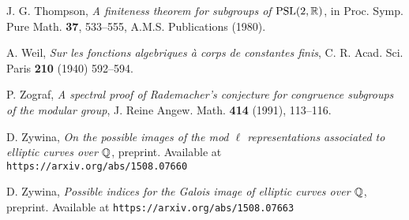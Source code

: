 \begin{thebibliography}{99}
 J. G. Thompson, \emph{A finiteness theorem for subgroups of $\operatorname{PSL}(2,\mathbb{R})$}, in Proc. Symp. Pure Math. \textbf{37}, 533--555, A.M.S. Publications (1980).

 A. Weil, \emph{Sur les fonctions algebriques \`{a} corps de constantes finis}, C. R. Acad. Sci. Paris \textbf{210} (1940) 592--594.

 P. Zograf, \emph{A spectral proof of Rademacher’s conjecture for congruence subgroups of the modular group}, J. Reine Angew. Math. \textbf{414} (1991), 113--116.

 D. Zywina, \emph{On the possible images of the mod $\ell$ representations associated to elliptic curves over $\mathbb{Q}$}, preprint.  Available at
{\tt{https://arxiv.org/abs/1508.07660}}

 D. Zywina, \emph{Possible indices for the Galois image of elliptic curves over $\mathbb{Q}$}, preprint.  Available at {\tt{https://arxiv.org/abs/1508.07663}}

\end{thebibliography}